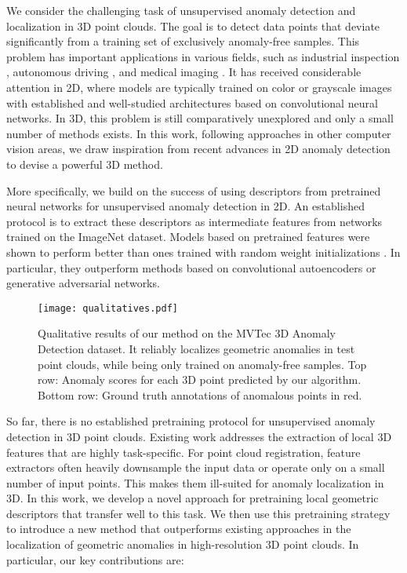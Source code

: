\documentclass[twoside,11pt]{article}
\begin{document}
We consider the challenging task of unsupervised anomaly detection and localization in 3D point clouds. The goal is to detect data points that deviate significantly from a training set of exclusively anomaly-free samples. This problem has important applications in various fields, such as industrial inspection \citep{Bergmann_2021_IJCV,Bergmann_2022_mvtec_3dad,handcrafted_feature_dictionary_nanofibres,song_steel_surface_defect_database}, autonomous driving \citep{fishyscapes2019,hendrycks_benchmark_anomaly_segmentation}, and medical imaging \citep{Bakas_2017,c_baur_vae_gan,brats2015}. It has received considerable attention in 2D, where models are typically trained on color or grayscale images with established and well-studied architectures based on convolutional neural networks. In 3D, this problem is still comparatively unexplored and only a small number of methods exists. In this work, following approaches in other computer vision areas, we draw inspiration from recent advances in 2D anomaly detection to devise a powerful 3D method.

More specifically, we build on the success of using descriptors from pretrained neural networks for unsupervised anomaly detection in 2D. An established protocol is to extract these descriptors as intermediate features from networks trained on the ImageNet \citep{krizhevsky2012imagenet} dataset. Models based on pretrained features were shown to perform better than ones trained with random weight initializations  \citep{bergmann2020uninformed,burlina2019whereiswally,cohen_2020_spade}. In particular, they outperform methods based on convolutional autoencoders or generative adversarial networks. 

\begin{figure}[t]
    \centering
\texttt{[image: qualitatives.pdf]}
    \caption{Qualitative results of our method on the MVTec 3D Anomaly Detection dataset. It reliably localizes geometric anomalies in test point clouds, while being only trained on anomaly-free samples. Top row: Anomaly scores for each 3D point predicted by our algorithm. Bottom row: Ground truth annotations of anomalous points in red.}
    \label{fig:teaser_figure}
\end{figure}

So far, there is no established pretraining protocol for unsupervised anomaly detection in 3D point clouds. Existing work addresses the extraction of local 3D features that are highly task-specific. For point cloud registration, feature extractors often heavily downsample the input data or operate only on a small number of input points. This makes them ill-suited for anomaly localization in 3D. 
In this work, we develop a novel approach for pretraining local geometric descriptors that transfer well to this task. We then use this pretraining strategy to introduce a new method that outperforms existing approaches in the localization of geometric anomalies in high-resolution 3D point clouds. In particular, our key contributions are:
\end{document}
